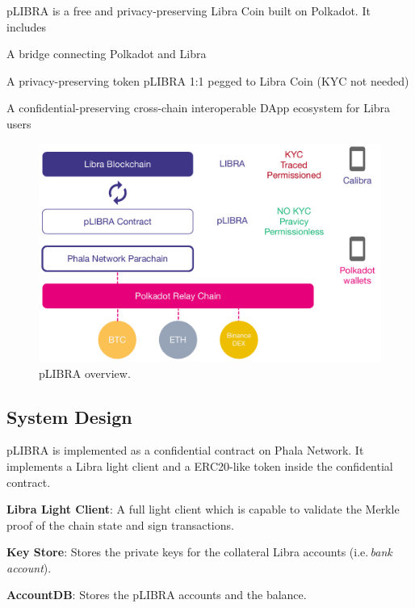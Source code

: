 pLIBRA is a free and privacy-preserving Libra Coin built on Polkadot. It includes

\begin{icompact}
    \item A bridge connecting Polkadot and Libra
    \item A privacy-preserving token pLIBRA 1:1 pegged to Libra Coin (KYC not needed)
    \item A confidential-preserving cross-chain interoperable DApp ecosystem for Libra users
\end{icompact}

\begin{figure}
    \centering \footnotesize
    \includegraphics[width=.7\columnwidth]{img/pLIBRA-structure}
    \caption{pLIBRA overview.}
    \label{fig:plibra}
\end{figure}

\subsection{System Design}

pLIBRA is implemented as a confidential contract on Phala Network. It implements a Libra light client and a ERC20-like token inside the confidential contract.

\begin{icompact}
    \item \textbf{Libra Light Client}: A full light client which is capable to validate the Merkle proof of the chain state and sign transactions.
    \item \textbf{Key Store}: Stores the private keys for the collateral Libra accounts (i.e.\,\textit{bank account}).
    \item \textbf{AccountDB}: Stores the pLIBRA accounts and the balance.
\end{icompact}

